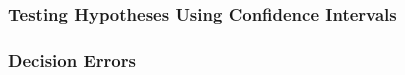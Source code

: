 \documentclass[slides]{beamer}
\newcommand{\blue}[1]{\textcolor{blue2}{#1}}
\begin{document}
\begin{frame}
\frametitle{Testing Hypotheses Using Confidence Intervals}

%
%
%
%
%
%

\end{frame}


\begin{frame}
\frametitle{Decision Errors}

%
%
%
%

\end{frame}
\end{document}
